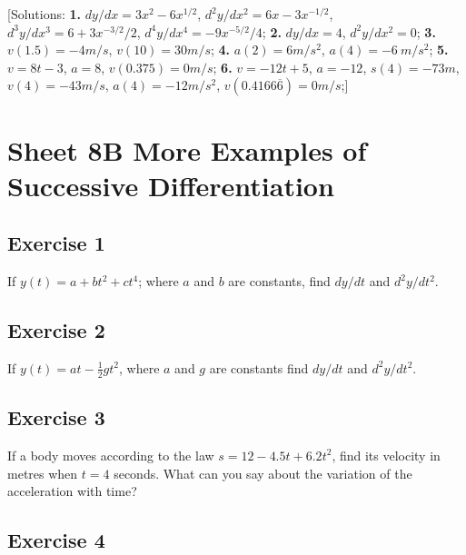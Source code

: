 \documentclass[
  11pt,
  oneside]{book}
\newcommand{\slide}{}
\theoremstyle{definition}
\theoremstyle{definition}
\theoremstyle{definition}
\theoremstyle{definition}
\theoremstyle{remark}
\begin{document}
{[}Solutions:
\textbf{1.} \(dy/dx=3x^2-6x^{1/2}\), \(d^2y/dx^2=6x-3x^{-1/2}\), \(d^3y/dx^3=6+3x^{-3/2}/2\), \(d^4y/dx^4=-9x^{-5/2}/4\);
\textbf{2.} \(dy/dx=4\), \(d^2y/dx^2=0\);
\textbf{3.} \(v(1.5) = -4m/s\), \(v(10) = 30m/s\);
\textbf{4.} \(a(2) = 6m/s^2\), \(a(4) = -6\ m/s^2\);
\textbf{5.} \(v=8t-3\), \(a=8\), \(v(0.375)=0m/s\);
\textbf{6.} \(v = -12t+5\), \(a=-12\), \(s(4) = -73m\), \(v(4)=-43m/s\), \(a(4)=-12m/s^2\), \(v(0.4166\overline{6})=0m/s\);{]}
\slide

\section{Sheet 8B More Examples of Successive Differentiation}\label{sheet-8b-more-examples-of-successive-differentiation}

\subsection*{Exercise 1}\label{exercise-1-3}

If \(y(t) = a + bt^2 + ct^4\); where \(a\) and \(b\) are constants, find \(dy/dt\) and \(d^2y/dt^2\).

\slide

\subsection*{Exercise 2}\label{exercise-2-3}

If \(y(t) = at -\frac 12gt^2\), where \(a\) and \(g\) are constants find \(dy/dt\) and \(d^2y/dt^2\).

\slide

\subsection*{Exercise 3}\label{exercise-3-2}

If a body moves according to the law \(s = 12 - 4.5t + 6.2t^2\), find its velocity in metres when \(t = 4\) seconds. What can you say about the variation of the acceleration with time?

\slide

\subsection*{Exercise 4}\label{exercise-4-2}
\end{document}

